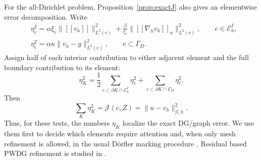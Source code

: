 \documentclass[pdflatex,sn-mathphys-num]{sn-jnl}
\theoremstyle{thmstyleone}
\theoremstyle{thmstyletwo}
\newcommand{\jump}[1]{\left[\!\left[#1\right]\!\right]}
\newcommand{\jumpn}[1]{\left[\!\left[#1\right]\!\right]_{n}}
\begin{document}
For the all-Dirichlet problem, Proposition~\ref{prop:exactJ} also gives an elementwise error decomposition.  Write
\begin{align}\label{eq:edge-indicator}
 &\eta_e^2=\alpha\xi_e\|\jump{v_h}\|_{L^2(e)}^2
 +\frac{\beta}{\xi_e}\|\jumpn{\nabla_hv_h}\|_{L^2(e)}^2,
 \qquad e\in\mathcal E_h^I,\\
 &\eta_e^2=\alpha\kappa\|v_h-g\|_{L^2(e)}^2,
 \qquad e\subset\Gamma_D.
\end{align}
Assign half of each interior contribution to either adjacent element and the full boundary contribution to its element:
\begin{equation}\label{eq:element-indicator}
 \eta_K^2=\frac12\sum_{e\subset\partial K\cap\mathcal E_h^I}\eta_e^2
 +\sum_{e\subset\partial K\cap\Gamma_D}\eta_e^2.
\end{equation}
Then
\begin{equation}\label{eq:exact-estimator}
 {\sum_K\eta_K^2=\mathcal J(c,Z)=\|u-v_h\|_{\mathcal G,h}^2.}
\end{equation}
Thus, for these tests, the numbers $\eta_K$ localize the exact DG/graph error.  We use them first to decide which elements require attention and, when only mesh refinement is allowed, in the usual D\"orfler marking procedure \cite{Dorfler1996}.  Residual based PWDG refinement is studied in \cite{KapitaMonkWarburton2015,CongreveHoustonPerugia2019}.
\end{document}
